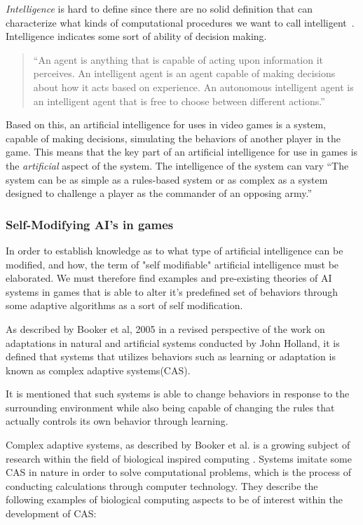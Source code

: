 \emph{Intelligence} is hard to define since there are no solid definition that can characterize what kinds of computational procedures we want to call intelligent~\cite{McCarthy2007}. Intelligence indicates some sort of ability of decision making.

\blockquote[{\autocite{Mills2005}}]{\enquote{An agent is anything that is capable of acting upon information it perceives. An intelligent agent is an agent capable of making decisions about how it acts based on experience. An autonomous intelligent agent is an intelligent agent that is free to choose between different actions.}}

Based on this, an artificial intelligence for uses in video games is a system, capable of making decisions, simulating the behaviors of another player in the game.
This means that the key part of an artificial intelligence for use in games is the \emph{artificial} aspect of the system. The intelligence of the system can vary \enquote{The system can be as simple as a rules-based system or as complex as a system designed to challenge a player as the commander of an opposing army.}\autocite{Kehoe2009}


\subsubsection{Self-Modifying AI's in games}\label{sec:selfmodifyingai}

In order to establish knowledge as to what type of artificial intelligence can be modified, and how, the term of "self modifiable" artificial intelligence must be elaborated. We must therefore find examples and pre-existing theories of AI systems in games that is able to alter it's predefined set of behaviors through some adaptive algorithms as a sort of self modification.

As described by Booker et al, 2005 \cite{Booker2005} in a revised perspective of the work on adaptations in natural and artificial systems conducted by John Holland, it is defined that systems that utilizes behaviors such as learning or adaptation is known as complex adaptive systems(CAS).\cite[pp. 1]{Booker2005}

It is mentioned that such systems is able to change behaviors in response to the surrounding environment while also being capable of changing the rules that actually controls its own behavior through learning.

Complex adaptive systems, as described by Booker et al. is a growing subject of research within the field of biological inspired computing\cite{Booker2005} . Systems imitate some CAS in nature in order to solve computational problems, which is the process of conducting calculations through computer technology. They describe the following examples of biological computing aspects to be of interest within the development of CAS:

